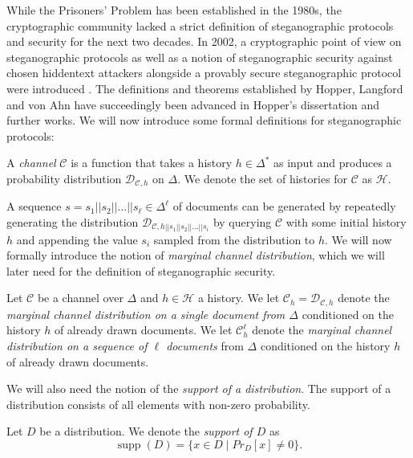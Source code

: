 While the Prisoners' Problem has been established in the 1980s, the cryptographic community lacked a strict definition of steganographic protocols and security for the next two decades.
In 2002, a cryptographic point of view on steganographic protocols as well as a notion of steganographic security against chosen hiddentext attackers alongside a provably secure steganographic protocol were introduced \cite{HLA2002}.
The definitions and theorems established by Hopper, Langford and von Ahn have succeedingly been advanced in Hopper's dissertation \cite{Hopper2004} and further works.
We will now introduce some formal definitions for steganographic protocols:
\begin{definition}[Channel]
A \emph{channel} $\mathcal{C}$ is a function that takes a history $h \in \Delta^*$ as input and produces a probability distribution $\mathcal{D}_{\mathcal{C},h}$ on $\Delta$.
We denote the set of histories for $\mathcal{C}$ as $\mathcal{H}$.
\end{definition}
A sequence $s = s_1||s_2||\dots||s_\ell \in \Delta^\ell$ of documents can be generated by repeatedly generating the distribution $\mathcal{D}_{\mathcal{C},h||s_1||s_2||\dots||s_i}$ by querying $\mathcal{C}$ with some initial history $h$ and appending the value $s_i$ sampled from the distribution to $h$.
We will now formally introduce the notion of \emph{marginal channel distribution}, which we will later need for the definition of steganographic security.
\begin{definition}
Let $\mathcal{C}$ be a channel over $\Delta$ and $h \in \mathcal{H}$ a history.
We let $\mathcal{C}_h = \mathcal{D}_{\mathcal{C},h}$ denote the \emph{marginal channel distribution on a single document from $\Delta$} conditioned on the history $h$ of already drawn documents.
We let $\mathcal{C}_h^\ell$ denote the \emph{marginal channel distribution on a sequence of $\ell$ documents} from $\Delta$ conditioned on the history $h$ of already drawn documents.
\end{definition}
We will also need the notion of the \emph{support of a distribution}.
The support of a distribution consists of all elements with non-zero probability.
\begin{definition}[Support]
Let $D$ be a distribution.
We denote the \emph{support of $D$} as 
$$\mathop{supp}(D) = \{ x \in D \mid Pr_{D}[x] \neq 0 \}.$$
\end{definition}
